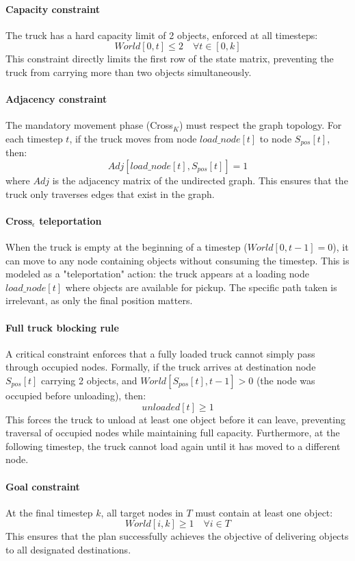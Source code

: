 \documentclass[a4paper,12pt]{article}
\begin{document}
\paragraph{Capacity constraint} The truck has a hard capacity limit of 2 objects, enforced at all timesteps:
$$World[0, t] \le 2 \quad \forall t \in [0, k]$$
This constraint directly limits the first row of the state matrix, preventing the truck from carrying more than two objects simultaneously.

\paragraph{Adjacency constraint} The mandatory movement phase (Cross$_K$) must respect the graph topology. For each timestep $t$, if the truck moves from node $load\_node[t]$ to node $S_{pos}[t]$, then:
$$Adj[load\_node[t], S_{pos}[t]] = 1$$
where $Adj$ is the adjacency matrix of the undirected graph. This ensures that the truck only traverses edges that exist in the graph.

\paragraph{Cross$_\epsilon$ teleportation} When the truck is empty at the beginning of a timestep ($World[0, t-1] = 0$), it can move to any node containing objects without consuming the timestep. This is modeled as a "teleportation" action: the truck appears at a loading node $load\_node[t]$ where objects are available for pickup. The specific path taken is irrelevant, as only the final position matters.

\paragraph{Full truck blocking rule} A critical constraint enforces that a fully loaded truck cannot simply pass through occupied nodes. Formally, if the truck arrives at destination node $S_{pos}[t]$ carrying 2 objects, and $World[S_{pos}[t], t-1] > 0$ (the node was occupied before unloading), then:
$$unloaded[t] \ge 1$$
This forces the truck to unload at least one object before it can leave, preventing traversal of occupied nodes while maintaining full capacity. Furthermore, at the following timestep, the truck cannot load again until it has moved to a different node.

\paragraph{Goal constraint} At the final timestep $k$, all target nodes in $T$ must contain at least one object:
$$World[i, k] \ge 1 \quad \forall i \in T$$
This ensures that the plan successfully achieves the objective of delivering objects to all designated destinations.
\end{document}
